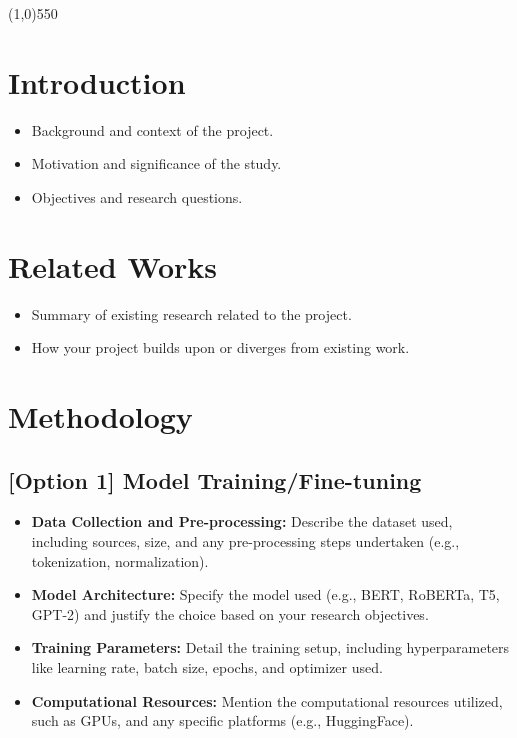 \documentclass{article}
\begin{document}
\line(1,0){550} 
\section{Introduction}
\begin{itemize}
    \item Background and context of the project.
    \item Motivation and significance of the study.
    \item Objectives and research questions.
\end{itemize}

\section{Related Works}
\begin{itemize}
    \item Summary of existing research related to the project.
    \item How your project builds upon or diverges from existing work.
\end{itemize}


\section{Methodology}
\subsection{[Option 1] Model Training/Fine-tuning}
\begin{itemize}
    \item \textbf{Data Collection and Pre-processing:} Describe the dataset used, including sources, size, and any pre-processing steps undertaken (e.g., tokenization, normalization).
    \item \textbf{Model Architecture:} Specify the model used (e.g., BERT, RoBERTa, T5, GPT-2) and justify the choice based on your research objectives.
    \item \textbf{Training Parameters:} Detail the training setup, including hyperparameters like learning rate, batch size, epochs, and optimizer used.
    \item \textbf{Computational Resources:} Mention the computational resources utilized, such as GPUs, and any specific platforms (e.g., HuggingFace).
\end{itemize}
\end{document}
